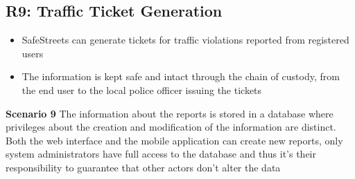 \subsection{R9: Traffic Ticket Generation}
\begin{itemize}
  \item SafeStreets can generate tickets for traffic violations reported from registered users
  \item The information is kept safe and intact through the chain of custody, from the end user to the local police officer issuing the tickets
\end{itemize}
\begin{description}
    \item \textbf{Scenario 9} \newline
        The information about the reports is stored in a database where privileges about the creation and modification of the information
        are distinct. Both the web interface and the mobile application can create new reports, only system administrators have full access to
        the database and thus it's their responsibility to guarantee that other actors don't alter the data


\end{description}
